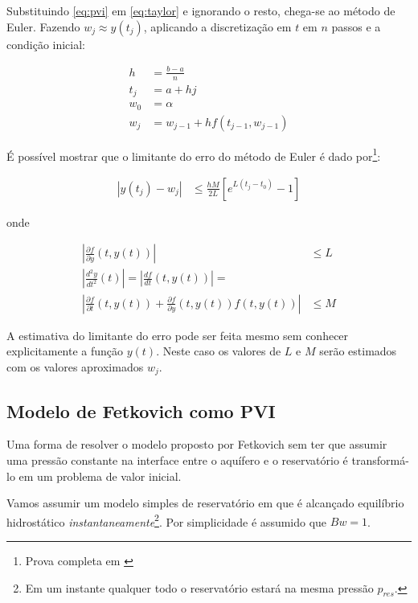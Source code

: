 \documentclass[final,5p]{elsarticle}
\numberwithin{equation}{section}
\begin{document}
        Substituindo \ref{eq:pvi} em \ref{eq:taylor} e ignorando o resto, chega-se ao método de Euler. Fazendo $w_j \approx y(t_j)$, aplicando a discretização em $t$ em $n$ passos e a condição inicial:

        \begin{align}
            h &= \frac{b-a}{n} \nonumber \\
            t_j &= a + h j \nonumber \\
            w_0 &= \alpha \nonumber \\
            w_j &= w_{j-1} + h f(t_{j-1}, w_{j-1}) \label{eq:euler}
        \end{align}

        É possível mostrar que o limitante do erro do método de Euler é dado por\footnote{Prova completa em \cite{burden2016analise}}:

        \begin{align}
            \left\lvert y(t_j) - w_j \right\rvert &\leq \frac{h M}{2 L} \left[ e^{L(t_j-t_0)} -1 \right]  \label{eq:limitante}
        \end{align}

        \noindent
        onde

        \begin{align}
            \left\lvert \frac{\partial f}{\partial y} (t,y(t)) \right\rvert &\leq L \label{eq:L} \\
            \left\lvert \frac{d^2y}{dt^2} (t) \right\rvert = \left\lvert \frac{df}{dt} (t,y(t)) \right\rvert =& \nonumber \\
            \left\lvert \frac{\partial f}{\partial t} (t,y(t)) + \frac{\partial f}{\partial y} (t,y(t)) f(t,y(t)) \right\rvert &\leq M \label{eq:M}
        \end{align}

        A estimativa do limitante do erro pode ser feita mesmo sem conhecer explicitamente a função $y(t)$. Neste caso os valores de $L$ e $M$ serão estimados com os valores aproximados $w_j$.

        \subsection{Modelo de Fetkovich como PVI}

        Uma forma de resolver o modelo proposto por Fetkovich sem ter que assumir uma pressão constante na interface entre o aquífero e o reservatório é transformá-lo em um problema de valor inicial.

        Vamos assumir um modelo simples de reservatório em que é alcançado equilíbrio hidrostático \emph{instantaneamente}\footnote{Em um instante qualquer todo o reservatório estará na mesma pressão $p_{res}$.}. Por simplicidade é assumido que $Bw=1$.
\end{document}
